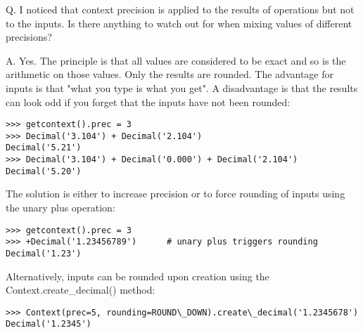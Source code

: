 Q. I noticed that context precision is applied to the results of operations but not to the inputs. Is there anything to watch out for when mixing values of different precisions?

A. Yes. The principle is that all values are considered to be exact and so is the arithmetic on those values. Only the results are rounded. The advantage for inputs is that "what you type is what you get". A disadvantage is that the results can look odd if you forget that the inputs have not been rounded:

\begin{lstlisting}
>>> getcontext().prec = 3
>>> Decimal('3.104') + Decimal('2.104')
Decimal('5.21')
>>> Decimal('3.104') + Decimal('0.000') + Decimal('2.104')
Decimal('5.20')
\end{lstlisting}

The solution is either to increase precision or to force rounding of inputs using the unary plus operation:

\begin{lstlisting}
>>> getcontext().prec = 3
>>> +Decimal('1.23456789')      # unary plus triggers rounding
Decimal('1.23')
\end{lstlisting}

Alternatively, inputs can be rounded upon creation using the Context.create\_decimal() method:

\begin{lstlisting}
>>> Context(prec=5, rounding=ROUND\_DOWN).create\_decimal('1.2345678')
Decimal('1.2345')
\end{lstlisting}

